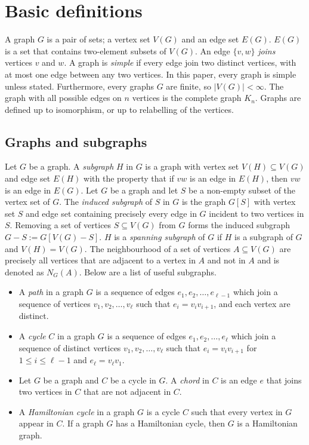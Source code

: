 
\section{Basic definitions}\label{sec: Basic definitions}
A graph $G$ is a pair of sets; a vertex set $V(G)$ and an edge set $E(G)$. $E(G)$ is a set that contains two-element subsets of $V(G)$. An edge $ \{v, w\}$ \textit{joins} vertices $v$ and $w$. A graph is \textit{simple} if every edge join two distinct vertices, with at most one edge between any two vertices. In this paper, every graph is simple unless stated. Furthermore, every graphs $G$ are finite, so $|V(G)| < \infty$. The graph with all possible edges on $n$ vertices is the complete graph $K_n$. Graphs are defined up to isomorphism, or up to relabelling of the vertices. 

\subsection{Graphs and subgraphs}
Let $G$ be a graph. A \textit{subgraph} $H$ in $G$ is a graph with vertex set $V(H) \subseteq V(G)$ and edge set $E(H)$ with the property that if $vw$ is an edge in $E(H)$, then $vw$ is an edge in $E(G)$.
Let $G$ be a graph and let $S$ be a non-empty subset of the vertex set of $G$. The \textit{induced subgraph} of $S$ in $G$ is the graph $G[S]$ with vertex set $S$ and edge set containing precisely every edge in $G$ incident to two vertices in $S$. Removing a set of vertices $S \subseteq V(G)$ from $G$ forms the induced subgraph $G - S := G[V(G) - S]$. 
$H$ is a \textit{spanning subgraph} of $G$ if $H$ is a subgraph of $G$ and $V(H) = V(G)$. 
The neighbourhood of a set of vertices $A \subseteq V(G)$ are precisely all vertices that are adjacent to a vertex in $A$ and not in $A$ and is denoted as $N_G(A)$. Below are a list of useful subgraphs.

\begin{itemize}
	\item A \textit{path} in a graph \(G\) is a sequence of edges \(e_1, e_2, \ldots, e_{\ell- 1}\) which join a sequence of vertices \(v_1, v_2, \ldots, v_{\ell}\) such that \(e_i = v_i v_{i + 1}\), and each vertex are distinct.
	\item A \textit{cycle} \(C\) in a graph \(G\) is a sequence of edges \(e_1, e_2, \ldots, e_{\ell}\) which join a sequence of distinct vertices \(v_1, v_2, \ldots, v_{\ell}\) such that \(e_i = v_i v_{i + 1}\) for \(1 \leq i \leq \ell - 1\) and \(e_\ell = v_\ell v_1\).
	\item Let $G$ be a graph and $C$ be a cycle in $G$. A \textit{chord} in $C$ is an edge $e$ that joins two vertices in $C$ that are not adjacent in $C$. 
	\item A \textit{Hamiltonian cycle} in a graph \(G\) is a cycle \(C\) such that every vertex in \(G\) appear in \(C\). If a graph $G$ has a Hamiltonian cycle, then $G$ is a Hamiltonian graph. 
\end{itemize}

